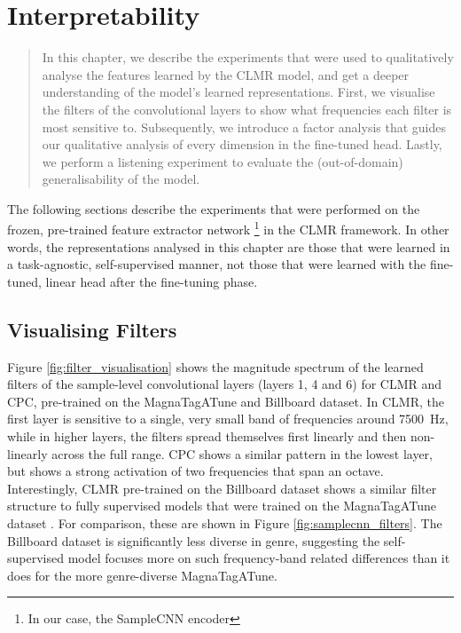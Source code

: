 \chapter{Interpretability}

\begin{quote}
    In this chapter, we describe the experiments that were used to qualitatively analyse the features learned by the CLMR model, and get a deeper understanding of the model's learned representations. First, we visualise the filters of the convolutional layers to show what frequencies each filter is most sensitive to. Subsequently, we introduce a factor analysis that guides our qualitative analysis of every dimension in the fine-tuned head. Lastly, we perform a listening experiment to evaluate the (out-of-domain) generalisability of the model.
\end{quote}

The following sections describe the experiments that were performed on the frozen, pre-trained feature extractor network \footnote{In our case, the SampleCNN encoder} in the CLMR framework. In other words, the representations analysed in this chapter are those that were learned in a task-agnostic, self-supervised manner, not those that were learned with the fine-tuned, linear head after the fine-tuning phase.

\section{Visualising Filters}
Figure \ref{fig:filter_visualisation} shows the magnitude spectrum of the learned filters of the sample-level convolutional layers (layers 1, 4 and 6) for CLMR and CPC, pre-trained on the MagnaTagATune and Billboard dataset.
In CLMR, the first layer is sensitive to a single, very small band of frequencies around 7500~Hz, while in higher layers, the filters spread themselves first linearly and then non-linearly across the full range.
CPC shows a similar pattern in the lowest layer, but shows a strong activation of two frequencies that span an octave.
Interestingly, CLMR pre-trained on the Billboard dataset shows a similar filter structure to fully supervised models that were trained on the MagnaTagATune dataset \cite{dieleman2014end,lee2018samplecnn}. For comparison, these are shown in Figure \ref{fig:samplecnn_filters}.
The Billboard dataset is significantly less diverse in genre, suggesting the self-supervised model focuses more on such frequency-band related differences than it does for the more genre-diverse MagnaTagATune.


